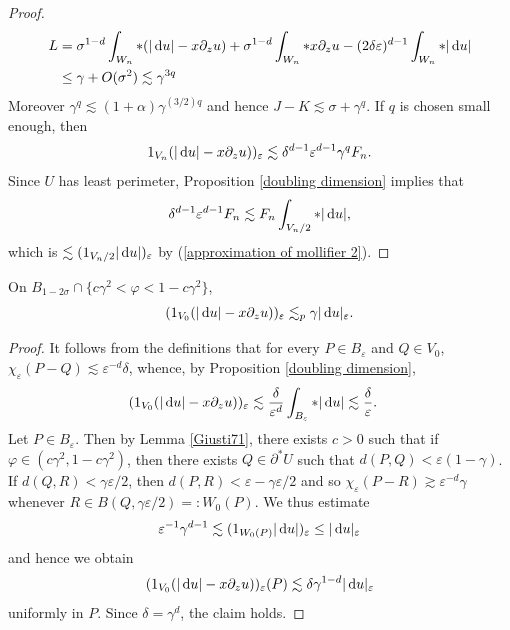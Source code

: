 \begin{proof}
\begin{align*}
L &= \sigma^{1 - d} \int_{W_n} *(|\mathop{}\!\mathrm{d} u| - x\partial_z u) + \sigma^{1 - d} \int_{W_n} *x\partial_z u - (2\delta\varepsilon)^{d - 1} \int_{W_n} *|\mathop{}\!\mathrm{d} u| \\
&\leq \gamma + O(\sigma^2) \lesssim \gamma^{3q}
\end{align*}
Moreover $\gamma^q \lesssim (1 + \alpha)\gamma^{(3/2)q}$ and hence $J - K \lesssim \sigma + \gamma^q$.
If $q$ is chosen small enough, then
\begin{equation}\label{big bound 1}
1_{V_n}(|\mathop{}\!\mathrm{d} u| - x\partial_z u))_\varepsilon \lesssim \delta^{d - 1} \varepsilon^{d - 1} \gamma^q F_n.
\end{equation}
Since $U$ has least perimeter, Proposition \ref{doubling dimension} implies that
$$\delta^{d - 1} \varepsilon^{d - 1} F_n \lesssim F_n \int_{V_n/2} *|\mathop{}\!\mathrm{d} u|,$$
which is $\lesssim (1_{V_n/2}|\mathop{}\!\mathrm{d} u|)_\varepsilon$ by (\ref{approximation of mollifier 2}).
\end{proof}

\begin{sublemma}
On $B_{1 - 2\sigma} \cap \{c\gamma^2 < \varphi < 1 - c\gamma^2\}$,
$$(1_{V_0}(|\mathop{}\!\mathrm{d} u| - x\partial_zu))_\varepsilon \lesssim_p \gamma |\mathop{}\!\mathrm{d} u|_\varepsilon.$$
\end{sublemma}
\begin{proof}
It follows from the definitions that for every $P \in B_\varepsilon$ and $Q \in V_0$, $\chi_\varepsilon(P - Q) \lesssim \varepsilon^{-d} \delta$,
whence, by Proposition \ref{doubling dimension},
\begin{align*}
(1_{V_0}(|\mathop{}\!\mathrm{d} u| - x\partial_zu))_\varepsilon &\lesssim \frac{\delta}{\varepsilon^d} \int_{B_\varepsilon} *|\mathop{}\!\mathrm{d} u| \lesssim \frac{\delta}{\varepsilon}.
\end{align*}
Let $P \in B_\varepsilon$. Then by Lemma \ref{Giusti71}, there exists $c > 0$ such that if $\varphi \in (c\gamma^2, 1 - c\gamma^2)$, then there exists $Q \in \partial^* U$ such that $d(P, Q) < \varepsilon(1 - \gamma)$.
If $d(Q, R) < \gamma\varepsilon/2$, then $d(P, R) < \varepsilon - \gamma\varepsilon/2$ and so $\chi_\varepsilon(P - R) \gtrsim \varepsilon^{-d}\gamma$ whenever $R \in B(Q, \gamma\varepsilon/2) =: W_0(P)$.
We thus estimate
$$\varepsilon^{-1} \gamma^{d - 1} \lesssim (1_{W_0(P)}|\mathop{}\!\mathrm{d} u|)_\varepsilon \leq |\mathop{}\!\mathrm{d} u|_\varepsilon$$
and hence we obtain
$$(1_{V_0}(|\mathop{}\!\mathrm{d} u| - x\partial_zu))_\varepsilon(P) \lesssim \delta \gamma^{1 - d} |\mathop{}\!\mathrm{d} u|_\varepsilon$$
uniformly in $P$. Since $\delta = \gamma^d$, the claim holds.
\end{proof}

